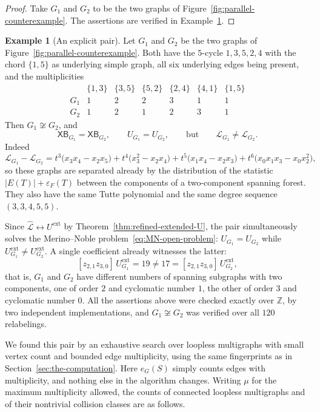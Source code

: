 \documentclass[11pt]{article}
\theoremstyle{plain}
\theoremstyle{definition}
\newtheorem{example}[theorem]{Example}
\renewcommand{\mathcal}{\mathscr}
\newcommand{\LL}{\mathcal{L}}    %
\newcommand{\XB}{\mathsf{XB}} %
\newcommand{\eps}{\varepsilon}
\newcommand{\ext}{\mathrm{ext}}
\newcommand{\ZZ}{\mathbb Z}
\numberwithin{equation}{section}
\begin{document}
\begin{proof}
  Take $G_1$ and $G_2$ to be the two graphs of Figure~\ref{fig:parallel-counterexample}.
  The assertions are verified in Example~\ref{ex:parallel-necessary}.
\end{proof}

\begin{example}[An explicit pair]
\label{ex:parallel-necessary}
Let $G_1$ and $G_2$ be the two graphs of Figure~\ref{fig:parallel-counterexample}.
Both have the $5$-cycle $1,3,5,2,4$ with the chord $\{1,5\}$ as underlying simple graph, all six
underlying edges being present, and the multiplicities
\[
\begin{array}{lcccccc}
     & \{1,3\} & \{3,5\} & \{5,2\} & \{2,4\} & \{4,1\} & \{1,5\}\\[1mm]
 G_1 &   1     &    2    &    2    &    3    &    1    &    1   \\
 G_2 &   1     &    2    &    1    &    2    &    3    &    1
\end{array}
\]
Then $G_1\not\cong G_2$, and
\[
   \XB_{G_1}=\XB_{G_2},
   \qquad
   U_{G_1}=U_{G_2},
   \qquad\text{but}\qquad
   \LL_{G_1}\ne\LL_{G_2}.
\]
Indeed
\[
   \LL_{G_1}-\LL_{G_2}
   =t^3\bigl(x_3x_4-x_2x_5\bigr)
    +t^4\bigl(x_3^2-x_2x_4\bigr)
    +t^5\bigl(x_1x_4-x_2x_3\bigr)
    +t^6\bigl(x_0x_1x_3-x_0x_2^2\bigr),
\]
so these graphs are separated already by the distribution of the statistic
$|E(T)|+\eps_F(T)$ between the components of a
two-component spanning forest.  They also have the same Tutte polynomial and
the same degree sequence $(3,3,4,5,5)$.

Since $\widehat{\LL}\leftrightarrow U^{\ext}$ by
Theorem~\ref{thm:refined-extended-U}, the pair simultaneously solves the
Merino--Noble problem~\eqref{eq:MN-open-problem}:
$U_{G_1}=U_{G_2}$ while
$U^{\ext}_{G_1}\ne U^{\ext}_{G_2}$.  A single coefficient
already witnesses the latter:
\[
   [z_{2,1}z_{3,0}]\,U^{\ext}_{G_1}=19
   \ne
   17=[z_{2,1}z_{3,0}]\,U^{\ext}_{G_2},
\]
that is, $G_1$ and $G_2$ have different numbers of spanning subgraphs with two
components, one of order $2$ and cyclomatic number $1$, the other of order
$3$ and cyclomatic number $0$.  All the assertions above
were checked exactly over $\ZZ$, by two independent implementations, and $G_1\not\cong G_2$
was verified over all $120$ relabelings.
\end{example}

We found this pair by an exhaustive search over loopless multigraphs with small
vertex count and bounded edge multiplicity, using the same fingerprints as in Section~\ref{sec:the-computation}.
Here $e_G(S)$ simply counts edges with multiplicity, and nothing else in the algorithm changes.
Writing $\mu$ for the maximum multiplicity allowed, the counts of connected loopless
multigraphs and of their nontrivial collision classes are as follows.
\end{document}
